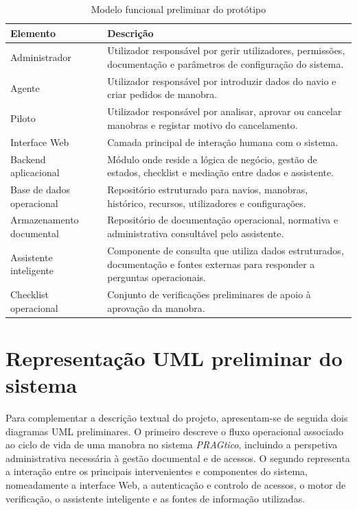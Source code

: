 \documentclass[a4paper,12pt]{report}
\begin{document}
\begin{table}[H]
\centering
\caption{Modelo funcional preliminar do protótipo}
\label{tab:modelofuncional}
\begin{tabular}{>{\raggedright\arraybackslash}p{3.2cm} >{\raggedright\arraybackslash}p{11cm}}
\toprule
\textbf{Elemento} & \textbf{Descrição} \\
\midrule
Administrador & Utilizador responsável por gerir utilizadores, permissões, documentação e parâmetros de configuração do sistema. \\
Agente & Utilizador responsável por introduzir dados do navio e criar pedidos de manobra. \\
Piloto & Utilizador responsável por analisar, aprovar ou cancelar manobras e registar motivo do cancelamento. \\
Interface Web & Camada principal de interação humana com o sistema. \\
Backend aplicacional & Módulo onde reside a lógica de negócio, gestão de estados, checklist e mediação entre dados e assistente. \\
Base de dados operacional & Repositório estruturado para navios, manobras, histórico, recursos, utilizadores e configurações. \\
Armazenamento documental & Repositório de documentação operacional, normativa e administrativa consultável pelo assistente. \\
Assistente inteligente & Componente de consulta que utiliza dados estruturados, documentação e fontes externas para responder a perguntas operacionais. \\
Checklist operacional & Conjunto de verificações preliminares de apoio à aprovação da manobra. \\
\bottomrule
\end{tabular}
\end{table}

\section{Representação UML preliminar do sistema}

Para complementar a descrição textual do projeto, apresentam-se de seguida dois diagramas UML preliminares. O primeiro descreve o fluxo operacional associado ao ciclo de vida de uma manobra no sistema \textit{PRAGtico}, incluindo a perspetiva administrativa necessária à gestão documental e de acessos. O segundo representa a interação entre os principais intervenientes e componentes do sistema, nomeadamente a interface Web, a autenticação e controlo de acessos, o motor de verificação, o assistente inteligente e as fontes de informação utilizadas.
\end{document}
